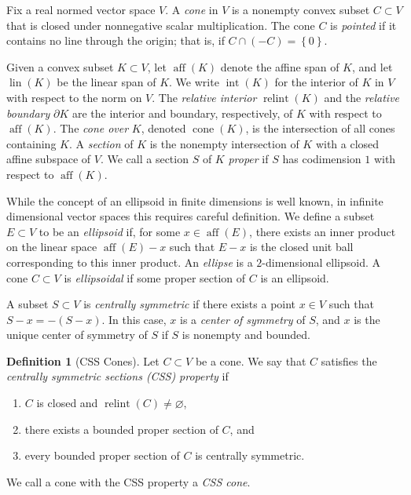\documentclass[10pt]{amsart}
\theoremstyle{definition}
\newtheorem{definition}[thm]{Definition}
\theoremstyle{remark}
\begin{document}
Fix a real normed vector space $V$.  A \emph{cone} in $V$ is a
nonempty convex subset $C\subset V$ that is closed under
nonnegative scalar multiplication.  The cone $C$ is \emph{pointed}
if it contains no line through the origin; that is, if $C \cap
(-C) = {\left\lbrace {0} \right\rbrace}$.

Given a convex subset $K \subset V$, let $\operatorname{aff}(K)$ denote the
affine span of $K$, and let $\operatorname{lin}(K)$ be the linear span of $K$.
We write ${\operatorname{int}}(K)$ for the interior of $K$ in $V$ with respect to
the norm on $V$.  The \emph{relative interior} ${\operatorname{relint}({K})}$ and
the \emph{relative boundary} ${\partial} K$ are the interior and
boundary, respectively, of $K$ with respect to $\operatorname{aff}(K)$.  The
\emph{cone over} $K$, denoted $\operatorname{cone}(K)$, is the intersection of
all cones containing $K$.  A \emph{section} of $K$ is the nonempty
intersection of $K$ with a closed affine subspace of $V$.  We call
a section $S$ of $K$ \emph{proper} if $S$ has codimension $1$ with
respect to $\operatorname{aff}(K)$.

While the concept of an ellipsoid in finite dimensions is well
known, in infinite dimensional vector spaces this requires careful
definition.  We define a subset $E \subset V$ to be an
\emph{ellipsoid} if, for some $x \in \operatorname{aff}(E)$, there exists an
inner product on the linear space $\operatorname{aff}(E) - x$ such that $E - x$
is the closed unit ball corresponding to this inner product.  An
\emph{ellipse} is a $2$-dimensional ellipsoid.  A cone $C \subset
V$ is \emph{ellipsoidal} if some proper section of $C$ is an
ellipsoid.

A subset $S \subset V$ is \emph{centrally symmetric} if there
exists a point $x \in V$ such that $S - x = -(S - x)$.  In this
case, $x$ is a \emph{center of symmetry} of $S$, and $x$ is the
unique center of symmetry of $S$ if $S$ is nonempty and bounded.

\begin{definition}[CSS Cones]
   \label{defn:CSSCones}
   Let $C \subset V$ be a cone.  We say that $C$
   satisfies the \emph{centrally symmetric sections
   \textup{(}CSS\textup{)} property} if
   \begin{enumerate}
      \item 
      $C$ is closed and ${\operatorname{relint}({C})} \ne {\varnothing}$,
      
      \item  
      there exists a bounded proper section of $C$, and
   
      \item  
      every bounded proper section of $C$ is centrally symmetric.
   \end{enumerate}
   We call a cone with the CSS property a \emph{CSS cone}.
\end{definition}
\end{document}
